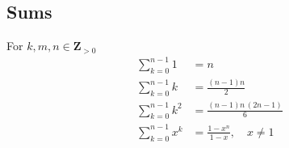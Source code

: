 \documentclass[letterpaper,9pt,fleqn]{extarticle}
\begin{document}
\begin{multicols*}{3}
\begin{minipage}{0.33333333333333\textwidth}
\section*{Sums}
\vspace{-0.35in}
For \(k, m,n\in \mathbf{Z}_{>0}\) 
\begin{align*}
    \sum_{k=0}^{n-1}1 &= n \\
     \sum_{k=0}^{n-1}{\left. k\right.} &=\frac{\left( n-1\right)  n}{2}\\
    \sum_{k=0}^{n-1}{\left. {{k}^{2}}\right.} &=\frac{\left( n-1\right)  n\, \left( 2 n-1\right) }{6}\\
    \sum_{k=0}^{n-1} x^k &= \frac{1-x^n}{1-x}, \quad  x \neq 1
 \end{align*}
\begin{comment}
(c) Inverse trig
\begin{align*}
\int {\left. \operatorname{acos}(x)\mathrm{d} x\right.}&=x \operatorname{acos}(x)-\sqrt{1-{{x}^{2}}},\\
\int {\left. \operatorname{asin}(x)\mathrm{d} x\right.}&=x \operatorname{asin}(x)+\sqrt{1-{{x}^{2}}},\\
\int {\left. \operatorname{atan}(x)\mathrm{d} x\right.}&=x \operatorname{atan}(x)-\nicefrac{\log{\left( {{x}^{2}}+1\right) }}{2}.
\end{align*}
(b)  Hyperbolic
\begin{align}
\int {\left. \cosh{(x)}\mathrm{d} x\right.}&=\operatorname{sinh}(x),\\
\int {\left. \operatorname{sinh}(x)\mathrm{d} x\right.}&=\cosh{(x)},\\
\int {\left. \operatorname{tanh}(x)\mathrm{d} x\right.}&=\ln{\left( \cosh{(x)}\right) },\\
\int {\left. \operatorname{sech}(x)\mathrm{d} x\right.}&=\operatorname{atan}\left( \operatorname{sinh}(x)\right) ,\\
\int {\left. \operatorname{csch}(x)\mathrm{d} x\right.}&=\ln{\left( \operatorname{tanh}\left( \nicefrac{x}{2}\right) \right) },\\
\int {\left. \operatorname{coth}(x)\mathrm{d} x\right.}&=\ln{\left( \operatorname{sinh}(x)\right) }.

\end{comment}
\end{minipage}
\end{multicols*}
\end{document}
